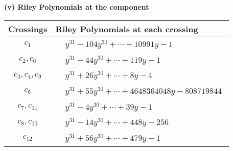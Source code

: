 \documentclass[1p]{elsarticle_modified}
\theoremstyle{definition}
\begin{document}
\newpage\renewcommand{\arraystretch}{1}
\flushleft \textbf{(v) Riley Polynomials at the component}\newline \\
\begin{tabular}{m{50pt}|m{274pt}}
Crossings & \hspace{64pt}Riley Polynomials at each crossing \\
\hline $$\begin{aligned}c_{1}\end{aligned}$$&$\begin{aligned}
&y^{31}-104 y^{30}+\cdots+10991 y-1
\end{aligned}$\\
\hline $$\begin{aligned}c_{2},c_{6}\end{aligned}$$&$\begin{aligned}
&y^{31}-44 y^{30}+\cdots+119 y-1
\end{aligned}$\\
\hline $$\begin{aligned}c_{3},c_{4},c_{9}\end{aligned}$$&$\begin{aligned}
&y^{31}+26 y^{30}+\cdots+8 y-4
\end{aligned}$\\
\hline $$\begin{aligned}c_{5}\end{aligned}$$&$\begin{aligned}
&y^{31}+55 y^{30}+\cdots+4648364048 y-808719844
\end{aligned}$\\
\hline $$\begin{aligned}c_{7},c_{11}\end{aligned}$$&$\begin{aligned}
&y^{31}-4 y^{30}+\cdots+39 y-1
\end{aligned}$\\
\hline $$\begin{aligned}c_{8},c_{10}\end{aligned}$$&$\begin{aligned}
&y^{31}-14 y^{30}+\cdots+448 y-256
\end{aligned}$\\
\hline $$\begin{aligned}c_{12}\end{aligned}$$&$\begin{aligned}
&y^{31}+56 y^{30}+\cdots+479 y-1
\end{aligned}$\\
\hline
\end{tabular}\\~\\
\end{document}
